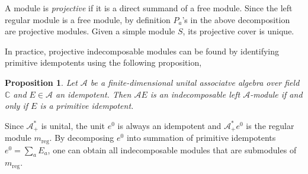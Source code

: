 \documentclass[prx, twocolumn, superscriptaddress, dvipsnames]{revtex4-2}
\newtheorem{prop}[thm]{Proposition}
\theoremstyle{definition}
\newcommand{\mA}{\mathcal{A}}
\newcommand{\reg}{\text{reg}}
\begin{document}
A module is \textit{projective} if it is a direct summand of a free module. Since the left regular module is a free module, by definition $P_a$'s in the above decomposition are projective modules. 
Given a simple module $S$, its projective cover is unique.

In practice, projective indecomposable modules can be found by identifying primitive idempotents using the following proposition,

\begin{prop}
Let $\mA$ be a finite-dimensional unital associatve algebra over field $\mathbb{C}$ and $E\in \mA$ an idempotent. Then $\mA E$ is an indecomposable left $\mA$-module if and only if $E$ is a primitive idempotent.
\end{prop}

Since $\mA^*_+$ is unital, the unit $e^0$ is always an idempotent and $\mA^*_+ e^0$ is the regular module $m_\reg$. By decomposing $e^0$ into summation of primitive idempotents $e^0=\sum_a E_a$, one can obtain all indecomposable modules that are submodules of $m_\reg$. 
\end{document}
